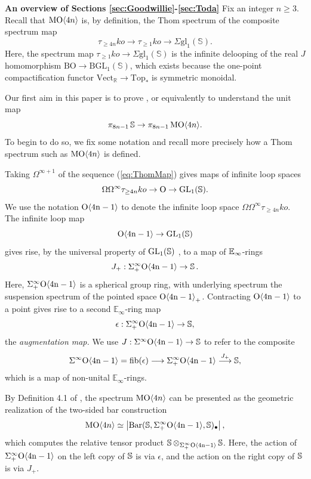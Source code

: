 {\bf An overview of Sections \ref{sec:Goodwillie}-\ref{sec:Toda}}
Fix an integer $n \ge 3$.  Recall that $\operatorname{\mathrm{MO}} \langle 4n \rangle$ is, by definition, the Thom spectrum \cite{BMMS,ABGHR} of the composite spectrum map
\begin{equation} \label{eq:ThomMap}
\tau_{\ge 4n} ko \to \tau_{\ge 1}ko \to \Sigma \mathrm{gl}_1(\mathbb{S}).
\end{equation}
Here, the spectrum map $\tau_{\ge 1}ko \to \Sigma \mathrm{gl}_1(\mathbb{S})$ is the infinite delooping of the real $J$ homomorphism $\mathrm{BO} \to \mathrm{BGL}_1(\mathbb{S})$, which exists because the one-point compactification functor $\mathrm{Vect}_{\mathbb{R}} \to \mathrm{Top}_*$ is symmetric monoidal.


Our first aim in this paper is to prove , or equivalently to understand the unit map
$$\pi_{8n-1} \operatorname{\mathbb{S}} \to \pi_{8n-1} \operatorname{\mathrm{MO}} \langle 4n \rangle.$$
To begin to do so, we fix some notation and recall more precisely how a Thom spectrum such as $\operatorname{\mathrm{MO}} \langle 4n \rangle$ is defined.

\begin{dfn}
Taking $\Omega^{\infty+1}$ of the sequence (\ref{eq:ThomMap}) gives maps of infinite loop spaces
$$\Omega \Omega^{\infty} \tau_{\ge 4n} ko \to \mathrm{O} \to \operatorname{\mathrm{GL}}_1(\mathbb{S}).$$
We use the notation $\mathrm{O \langle 4n-1\rangle}$ to denote the infinite loop space $\Omega \Omega^{\infty} \tau_{\ge 4n} ko$.
The infinite loop map
$$\mathrm{O \langle 4n-1\rangle} \to \operatorname{\mathrm{GL}}_1(\mathbb{S})$$
gives rise, by the universal property of $\operatorname{\mathrm{GL}}_1(\mathbb{S})$ \cite[Theorem 5.1]{ABGHR}, to a map of $\operatorname{\mathbb{E}}_{\infty}$-rings
$$J_+:\Sigma^{\infty}_+ \mathrm{O \langle 4n-1\rangle} \to \operatorname{\mathbb{S}}.$$
Here, $\Sigma^{\infty}_+ \mathrm{O \langle 4n-1\rangle}$ is a spherical group ring, with underlying spectrum the suspension spectrum of the pointed space $\mathrm{O \langle 4n-1\rangle}_+$.
Contracting $\mathrm{O \langle 4n-1\rangle}$ to a point gives rise to a second $\mathbb{E}_\infty$-ring map
$$\epsilon:\Sigma^{\infty}_+ \mathrm{O \langle 4n-1\rangle} \to \operatorname{\mathbb{S}},$$
the \emph{augmentation map.}  We use $J:\Sigma^{\infty} \mathrm{O \langle 4n-1\rangle} \to \operatorname{\mathbb{S}}$ to refer to the composite 
$$\Sigma^{\infty} \mathrm{O \langle 4n-1\rangle} = \operatorname{\mathrm{fib}}(\epsilon) \longrightarrow \Sigma^{\infty}_+ \mathrm{O \langle 4n-1\rangle} \stackrel{J_+}{\longrightarrow} \operatorname{\mathbb{S}},$$
which is a map of non-unital $\mathbb{E}_\infty$-rings.
\end{dfn}

\begin{cnstr} \label{cnstr:barconstruction}
By Definition 4.1 of \cite{ABGHR}, the spectrum $\operatorname{\mathrm{MO}} \langle 4n \rangle$ can be presented as the geometric realization of the two-sided bar construction
$$\operatorname{\mathrm{MO}} \langle 4n \rangle \simeq \left|\operatorname{\mathrm{Bar}}(\operatorname{\mathbb{S}},\Sigma^{\infty}_+ \mathrm{O \langle 4n-1\rangle}, \operatorname{\mathbb{S}})_{\bullet} \right|,$$
which computes the relative tensor product $\operatorname{\mathbb{S}} \otimes_{\Sigma^{\infty}_+ \mathrm{O \langle 4n-1\rangle}} \operatorname{\mathbb{S}}$.
Here, the action of $\Sigma^{\infty}_+ \mathrm{O \langle 4n-1\rangle}$ on the left copy of $\operatorname{\mathbb{S}}$ is via $\epsilon$, and the action on the right copy of $\operatorname{\mathbb{S}}$ is via $J_+$.
\end{cnstr}

